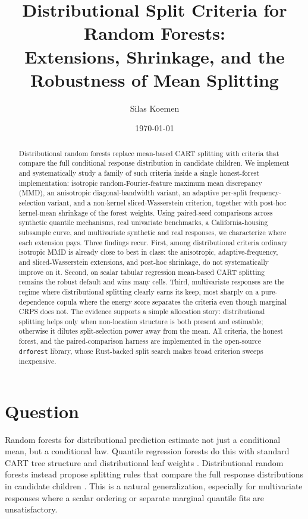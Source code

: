 \documentclass[11pt]{article}
\title{Distributional Split Criteria for Random Forests:\\
Extensions, Shrinkage, and the Robustness of Mean Splitting}
\author{Silas Koemen}
\date{\today}
\theoremstyle{remark}
\begin{document}
\maketitle

\begin{abstract}
Distributional random forests replace mean-based CART splitting with criteria
that compare the full conditional response distribution in candidate children.
We implement and systematically study a family of such criteria inside a single
honest-forest implementation: isotropic random-Fourier-feature maximum mean
discrepancy (MMD), an anisotropic diagonal-bandwidth variant, an adaptive
per-split frequency-selection variant, and a non-kernel sliced-Wasserstein
criterion, together with post-hoc kernel-mean shrinkage of the forest weights.
Using paired-seed comparisons across synthetic quantile mechanisms, real
univariate benchmarks, a California-housing subsample curve, and multivariate
synthetic and real responses, we characterize where each extension pays.  Three
findings recur.  First, among distributional criteria ordinary isotropic MMD is
already close to best in class: the anisotropic, adaptive-frequency, and
sliced-Wasserstein extensions, and post-hoc shrinkage, do not systematically
improve on it.  Second, on scalar tabular regression mean-based CART splitting
remains the robust default and wins many cells.  Third, multivariate responses
are the regime where distributional splitting clearly earns its keep, most
sharply on a pure-dependence copula where the energy score separates the
criteria even though marginal CRPS does not.  The evidence supports a simple
allocation story: distributional splitting helps only when non-location
structure is both present and estimable; otherwise it dilutes split-selection
power away from the mean.  All criteria, the honest forest, and the
paired-comparison harness are implemented in the open-source \texttt{drforest}
library, whose Rust-backed split search makes broad criterion sweeps inexpensive.
\end{abstract}

\section{Question}

Random forests for distributional prediction estimate not just a conditional
mean, but a conditional law.  Quantile regression forests do this with standard
CART tree structure and distributional leaf weights \citep{meinshausen2006}.
Distributional random forests instead propose splitting rules that compare the
full response distributions in candidate children \citep{cevid2022}.  This is a
natural generalization, especially for multivariate responses where a scalar
ordering or separate marginal quantile fits are unsatisfactory.
\end{document}
